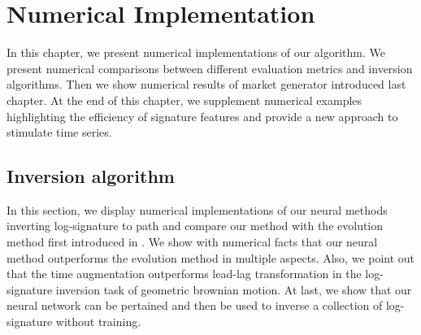 \documentclass[12pt]{report}
\theoremstyle{definition}
\theoremstyle{remark}
\begin{document}

\chapter{Numerical Implementation}\label{NumericalImplementation}
In this chapter, we present numerical implementations of our algorithm. We present numerical comparisons between different evaluation metrics and inversion algorithms. Then we show numerical results of market generator introduced last chapter. At the end of this chapter, we supplement numerical examples highlighting the efficiency of signature features and provide a new approach to stimulate time series. 


\section{Inversion algorithm}
In this section, we display numerical implementations of our neural methods inverting log-signature to path and compare our method with the evolution method first introduced in \cite{buehler2020data}. We show with numerical facts that our neural method outperforms the evolution method in multiple aspects. Also, we point out that the time augmentation outperforms lead-lag transformation in the log-signature inversion task of geometric brownian motion. At last, we show that our neural network can be pertained and then be used to inverse a collection of log-signature without training.
\end{document}
